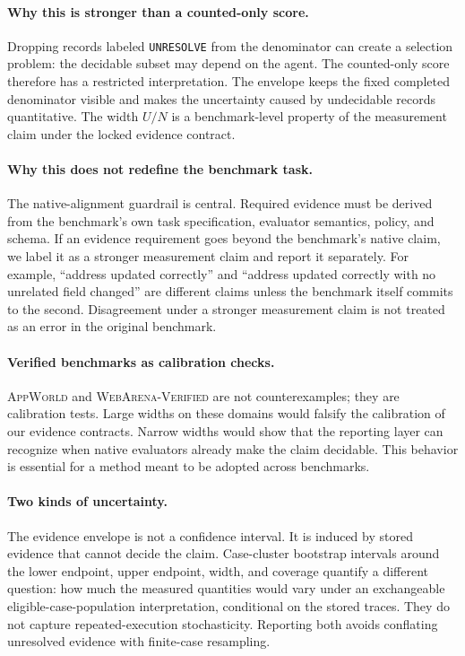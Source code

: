 \documentclass{article}
\newcommand{\appworld}{\textsc{AppWorld}\xspace}
\newcommand{\webarena}{\textsc{WebArena-Verified}\xspace}
\begin{document}
\paragraph{Why this is stronger than a counted-only score.}
Dropping records labeled \texttt{UNRESOLVE} from the denominator can create a
selection problem: the decidable subset may depend on the agent. The
counted-only score therefore has a restricted interpretation. The envelope
keeps the fixed completed denominator visible and makes the uncertainty caused
by undecidable records quantitative. The width \(U/N\) is a benchmark-level
property of the measurement claim under the locked evidence contract.

\paragraph{Why this does not redefine the benchmark task.}
The native-alignment guardrail is central. Required evidence must be derived
from the benchmark's own task specification, evaluator semantics, policy, and
schema. If an evidence requirement goes beyond the benchmark's native claim, we
label it as a stronger measurement claim and report it separately. For example,
``address updated correctly'' and ``address updated correctly with no unrelated
field changed'' are different claims unless the benchmark itself commits to the
second. Disagreement under a stronger measurement claim is not treated as an
error in the original benchmark.

\paragraph{Verified benchmarks as calibration checks.}
\appworld and \webarena are not counterexamples; they are calibration tests.
Large widths on these domains would falsify the calibration of our evidence
contracts. Narrow widths would show that the reporting layer can recognize when
native evaluators already make the claim decidable. This behavior is essential
for a method meant to be adopted across benchmarks.

\paragraph{Two kinds of uncertainty.}
The evidence envelope is not a confidence interval. It is induced by stored
evidence that cannot decide the claim. Case-cluster bootstrap intervals around
the lower endpoint, upper endpoint, width, and coverage quantify a different
question: how much the measured quantities would vary under an exchangeable
eligible-case-population interpretation, conditional on the stored traces. They
do not capture repeated-execution stochasticity. Reporting both avoids
conflating unresolved evidence with finite-case resampling.
\end{document}
